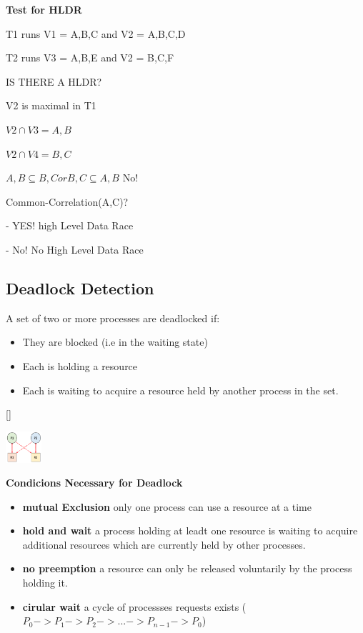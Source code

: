 \textbf{Test for HLDR}

T1 runs V1 = {A,B,C} and V2 = {A,B,C,D}\par
T2 runs V3 = {A,B,E} and V2 = {B,C,F}\par
IS THERE A HLDR?\par

V2 is maximal in T1\par
$V2 \cap V3 = {A,B}$\par
$V2 \cap V4 = {B,C}$\par
${A,B} \subseteq {B,C} or {B,C} \subseteq {A,B}$ No!\par
Common-Correlation(A,C)?\par
 - YES! high Level Data Race \par
 - No! No High Level Data Race

\subsection{Deadlock Detection}

A set of two or more processes are deadlocked if:\par
\begin{itemize}
    \item They are blocked (i.e in the waiting state)
    \item Each is holding a resource
    \item Each is waiting to acquire a resource held by another process in the set.
\end{itemize}[]

\includegraphics[width=0.1\textwidth]{concurrency-errors/graphdeadlock.png}

\textbf{Condicions Necessary for Deadlock}\par
\begin{itemize}
    \item \textbf{mutual Exclusion} only one process can use a resource at a time
    \item \textbf{hold and wait} a process holding at leadt one resource is waiting to acquire additional resources which are currently held by other processes.
    \item \textbf{no preemption} a resource can only be released voluntarily by the process holding it.
    \item \textbf{cirular wait} a cycle of processses requests exists ($P_0 -> P_1 -> P_2 -> ... -> P_{n-1} -> P_0$)
\end{itemize}

